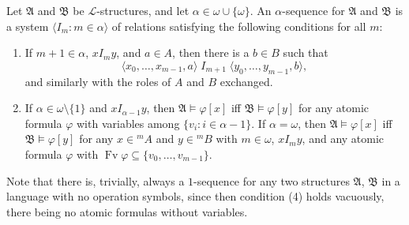Let $\mathfrak{A}$ and $\mathfrak{B}$ be $\mathcal{L}$-structures, and let $\alpha \in \omega \cup \{\omega\}$. An $\alpha$-sequence for $\mathfrak{A}$ and $\mathfrak{B}$ is a system $\langle I_m : m \in \alpha \rangle$ of relations satisfying the following conditions for all $m$:

\begin{enumerate}
\item[(3)] If $m + 1 \in \alpha$, $x I_m y$, and $a \in A$, then there is a $b \in B$ such that
  $$\langle x_0, \ldots, x_{m-1}, a \rangle \; I_{m+1} \; \langle y_0, \ldots, y_{m-1}, b \rangle,$$
  and similarly with the roles of $A$ and $B$ exchanged.

\item[(4)] If $\alpha \in \omega \setminus \{1\}$ and $x I_{\alpha-1} y$, then $\mathfrak{A} \models \varphi[x]$ iff $\mathfrak{B} \models \varphi[y]$ for any atomic formula $\varphi$ with variables among $\{v_i : i \in \alpha - 1\}$. If $\alpha = \omega$, then $\mathfrak{A} \models \varphi[x]$ iff $\mathfrak{B} \models \varphi[y]$ for any $x \in {}^m A$ and $y \in {}^m B$ with $m \in \omega$, $x I_m y$, and any atomic formula $\varphi$ with $\operatorname{Fv} \varphi \subseteq \{v_0, \ldots, v_{m-1}\}$.
\end{enumerate}

Note that there is, trivially, always a $1$-sequence for any two structures $\mathfrak{A}$, $\mathfrak{B}$ in a language with no operation symbols, since then condition (4) holds vacuously, there being no atomic formulas without variables.
